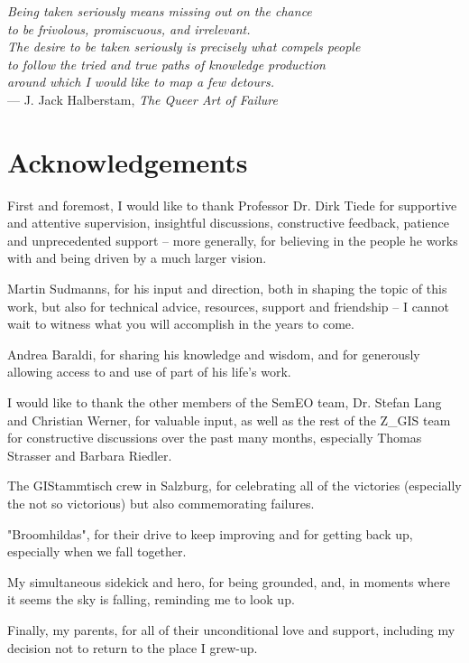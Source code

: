 \cleardoublepage
{}

\begin{flushright}{\slshape
    Being taken seriously means missing out on the chance \\
    to be frivolous, promiscuous, and irrelevant. \\
    The desire to be taken seriously is precisely what compels people \\
    to follow the tried and true paths of knowledge production \\
    around which I would like to map a few detours.} \\ \medskip
    --- J. Jack Halberstam, \emph{The Queer Art of Failure}
\end{flushright}



\bigskip

\begingroup
\let\clearpage\relax
\let\cleardoublepage\relax
\let\cleardoublepage\relax
\chapter*{Acknowledgements}
First and foremost, I would like to thank Professor Dr. Dirk Tiede for supportive and attentive supervision, insightful discussions, constructive feedback, patience and unprecedented support -- more generally, for believing in the people he works with and being driven by a much larger vision.

Martin Sudmanns, for his input and direction, both in shaping the topic of this work, but also for technical advice, resources, support and friendship -- I cannot wait to witness what you will accomplish in the years to come.

Andrea Baraldi, for sharing his knowledge and wisdom, and for generously allowing access to and use of part of his life's work.

I would like to thank the other members of the SemEO team, Dr. Stefan Lang and Christian Werner, for valuable input, as well as the rest of the Z\_GIS team for constructive discussions over the past many months, especially Thomas Strasser and Barbara Riedler.

The GIStammtisch crew in Salzburg, for celebrating all of the victories (especially the not so victorious) but also commemorating failures.

"Broomhildas", for their drive to keep improving and for getting back up, especially when we fall together.

My simultaneous sidekick and hero, for being grounded, and, in moments where it seems the sky is falling, reminding me to look up.

Finally, my parents, for all of their unconditional love and support, including my decision not to return to the place I grew-up.

\endgroup
